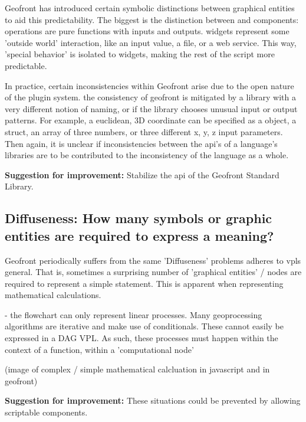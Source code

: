Geofront has introduced certain symbolic distinctions between graphical entities to aid this predictability. 
The biggest is the distinction between  and  components: 
operations are pure functions with inputs and outputs. 
widgets represent some 'outside world' interaction, like an input value, a file, or a web service. 
This way, 'special behavior' is isolated to widgets, making the rest of the script more predictable. 

In practice, certain inconsistencies within Geofront arise due to the open nature of the plugin system. 
the consistency of geofront is mitigated by a library with a very different notion of naming, or if the library chooses unusual input or output patterns. 
For example, a euclidean, 3D coordinate can be specified as a  object, a struct, an array of three numbers, or three different x, y, z input parameters.
Then again, it is unclear if inconsistencies between the api's of a language's libraries are to be contributed to the inconsistency of the language as a whole. 

\textbf{Suggestion for improvement:} Stabilize the api of the Geofront Standard Library.



\subsection*{Diffuseness: How many symbols or graphic entities are required to express a meaning?}

Geofront periodically suffers from the same 'Diffuseness' problems \cite[]{green_usability_1996} adheres to vpls general. 
That is, sometimes a surprising number of 'graphical entities' / nodes are required to represent a simple statement.  
This is apparent when representing mathematical calculations. 

\begin{note}
  - the flowchart can only represent linear processes. Many geoprocessing algorithms are iterative and make use of conditionals. These cannot easily be expressed in a DAG VPL. As such, these processes must happen within the context of a function, within a 'computational node'  
\end{note}


(image of complex / simple mathematical calcluation in javascript and in geofront)

\textbf{Suggestion for improvement:} These situations could be prevented by allowing scriptable components. 

